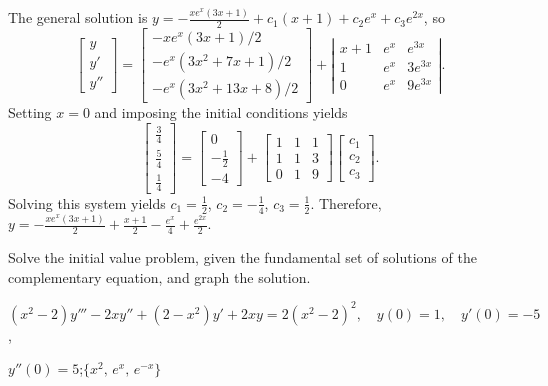 \documentclass{ximera}
\begin{document}
\begin{problem}
\begin{solution}
The general solution is
$y=-\frac{xe^x(3x+1)}{2}+c_1(x+1)+c_2e^x+c_3e^{2x}$, so
$$
\left[\begin{array}{l}y\\y'\\y''
\end{array}\right]=
\left[\begin{array}{c}
-xe^x(3x+1)/2\\
-e^x(3x^2+7x+1)/2\\
-e^x(3x^2+13x+8)/2
\end{array}\right]+
\left|\begin{array}{cccc}
x+1&e^x&e^{3x}\\1&e^x&3e^{3x}\\0&e^x&9e^{3x}
\end{array}\right|.
$$
Setting $x=0$ and imposing the initial conditions yields
$$
\left[\begin{array}{c}
\frac{3}{4}\\\frac{5}{4}\\\frac{1}{4}
\end{array}\right]=
\left[\begin{array}{r}
0\\-\frac{1}{2}\\-4
\end{array}\right]
+
\left[\begin{array}{ccc}
1&1&1\\ 1&1&3\\ 0&1&9
\end{array}\right]
\left[\begin{array}{c}
c_{1}\\ c_{2}\\ c_{3}
\end{array}\right].
$$
Solving this system yields $c_1=\frac{1}{2}$, $c_2=-\frac{1}{4}$,
$c_3=\frac{1}{2}$. Therefore,
$y=-\frac{xe^x(3x+1)}{2}+\frac{x+1}{2}-\frac{e^x}{4}+\frac{e^{2x}}{2}$.
\end{solution}
\end{problem}

\begin{problem}\label{exer:9.4.29}  Solve the
initial value problem, given the fundamental set of solutions of the complementary equation, and graph the solution.

$(x^2-2)y'''-2xy''+(2-x^2)y'+2xy=2(x^2-2)^2, \quad  y(0)=1,\quad y'(0)=-5$,

 $y''(0)=5$;\quad      $\{x^2,\,e^x,\,e^{-x}\}$
\end{problem}
\end{document}
